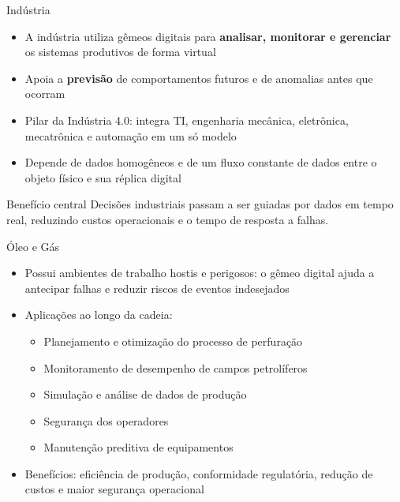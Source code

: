 \documentclass[aspectratio=169,xcolor=dvipsnames]{beamer}
\begin{document}
\begin{frame}{Indústria}
    \begin{itemize}
        \item A indústria utiliza gêmeos digitais para \textbf{analisar, monitorar e gerenciar} os sistemas produtivos de forma virtual
        \item Apoia a \textbf{previsão} de comportamentos futuros e de anomalias antes que ocorram
        \item Pilar da Indústria 4.0: integra TI, engenharia mecânica, eletrônica, mecatrônica e automação em um só modelo
        \item Depende de dados homogêneos e de um fluxo constante de dados entre o objeto físico e sua réplica digital
    \end{itemize}
    \begin{exampleblock}{Benefício central}
        Decisões industriais passam a ser guiadas por dados em tempo real, reduzindo custos operacionais e o tempo de resposta a falhas.
    \end{exampleblock}
\end{frame}

\begin{frame}{Óleo e Gás}
    \begin{itemize}
        \item Possui ambientes de trabalho hostis e perigosos: o gêmeo digital ajuda a antecipar falhas e reduzir riscos de eventos indesejados
        \item Aplicações ao longo da cadeia:
        \begin{itemize}
            \item Planejamento e otimização do processo de perfuração
            \item Monitoramento de desempenho de campos petrolíferos
            \item Simulação e análise de dados de produção
            \item Segurança dos operadores 
            \item Manutenção preditiva de equipamentos
        \end{itemize}
        \item Benefícios: eficiência de produção, conformidade regulatória, redução de custos e maior segurança operacional
    \end{itemize}
\end{frame}
\end{document}
